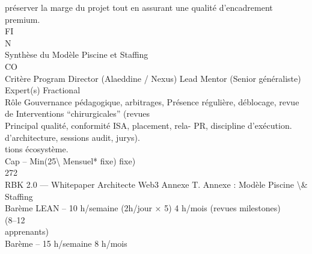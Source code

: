 préserver la marge du projet tout en assurant une qualité d’encadrement premium.\\
\vspace{0.5em}
\vspace{0.5em}
\vspace{0.5em}
\vspace{0.5em}
FI\\
N\\
Synthèse du Modèle Piscine et Staffing\\
CO\\
Critère          Program Director (Alaeddine / Nexus) Lead Mentor (Senior généraliste)                        Expert(s) Fractional\\
\vspace{0.5em}
Rôle             Gouvernance pédagogique, arbitrages, Présence régulière, déblocage, revue de Interventions “chirurgicales” (revues\\
Principal        qualité, conformité ISA, placement, rela- PR, discipline d’exécution.        d’architecture, sessions audit, jurys).\\
tions écosystème.\\
\vspace{0.5em}
Cap              –                                             Min(25\textbackslash{}%
Mensuel*                                                       fixe)                               fixe)\\
\vspace{0.5em}
\vspace{0.5em}
\vspace{0.5em}
\vspace{0.5em}
272\\
RBK 2.0 — Whitepaper Architecte Web3                                           Annexe T. Annexe : Modèle Piscine \textbackslash{}& Staffing\\
\vspace{0.5em}
\vspace{0.5em}
\vspace{0.5em}
\vspace{0.5em}
Barème LEAN –                          10 h/semaine (2h/jour × 5)            4 h/mois (revues milestones)\\
(8–12\\
apprenants)\\
\vspace{0.5em}
Barème         –                       15 h/semaine                          8 h/mois\\
